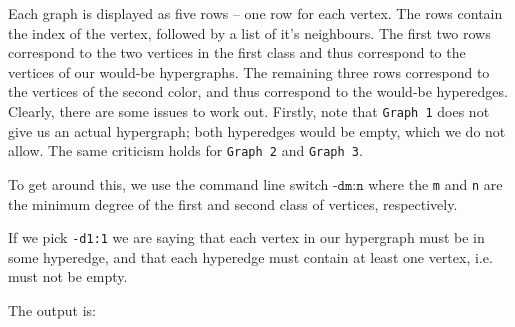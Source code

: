 Each graph is displayed as five rows -- one row for each vertex.
The rows contain the index of the vertex, followed by a list of it's neighbours.
The first two rows correspond to the two vertices in the first class and thus correspond to the vertices of our would-be hypergraphs.
The remaining three rows correspond to the vertices of the second color, and thus correspond to the would-be hyperedges.
Clearly, there are some issues to work out. Firstly, note that \texttt{Graph 1} does not give us an actual hypergraph; both hyperedges would be empty, which we do not allow. The same criticism holds for \texttt{Graph 2} and \texttt{Graph 3}.

To get around this, we use the command line switch $\texttt{-dm:n}$ where the \texttt{m} and \texttt{n} are the minimum degree of the first and second class of vertices, respectively.

If we pick \texttt{-d1:1} we are saying that each vertex in our hypergraph must be in some hyperedge, and that each hyperedge must contain at least one vertex, i.e. must not be empty.


The output is:

